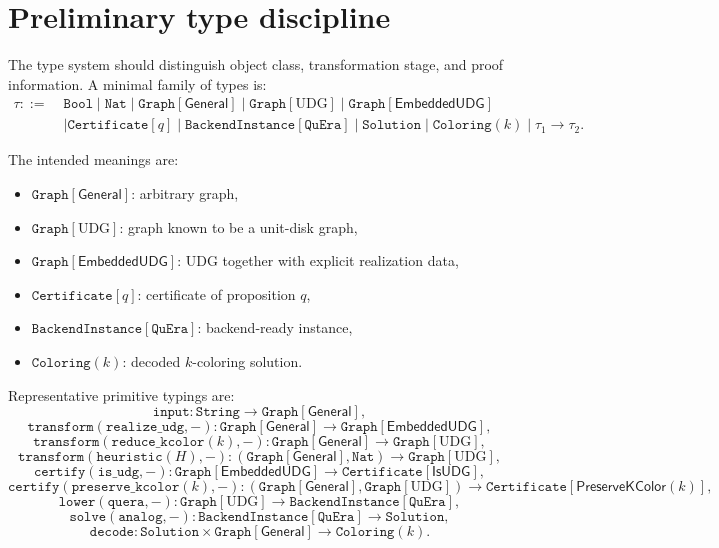 \documentclass[11pt]{article}
\newcommand{\UDG}{\mathrm{UDG}}
\newcommand{\Gen}{\mathsf{General}}
\newcommand{\Emb}{\mathsf{EmbeddedUDG}}
\begin{document}
\section{Preliminary type discipline}

The type system should distinguish object class, transformation stage, and proof information. A minimal family of types is:
\[
\begin{aligned}
\tau ::=\;& \texttt{Bool}
\mid \texttt{Nat}
\mid \texttt{Graph}[\Gen]
\mid \texttt{Graph}[\UDG]
\mid \texttt{Graph}[\Emb]\\
&\mid \texttt{Certificate}[q]
\mid \texttt{BackendInstance}[\texttt{QuEra}]
\mid \texttt{Solution}
\mid \texttt{Coloring}(k)
\mid \tau_1 \to \tau_2.
\end{aligned}
\]

The intended meanings are:
\begin{itemize}
    \item $\texttt{Graph}[\Gen]$: arbitrary graph,
    \item $\texttt{Graph}[\UDG]$: graph known to be a unit-disk graph,
    \item $\texttt{Graph}[\Emb]$: UDG together with explicit realization data,
    \item $\texttt{Certificate}[q]$: certificate of proposition $q$,
    \item $\texttt{BackendInstance}[\texttt{QuEra}]$: backend-ready instance,
    \item $\texttt{Coloring}(k)$: decoded $k$-coloring solution.
\end{itemize}

Representative primitive typings are:
\[
\texttt{input} : \texttt{String} \to \texttt{Graph}[\Gen],
\]
\[
\texttt{transform}(\texttt{realize\_udg},-) : \texttt{Graph}[\Gen] \to \texttt{Graph}[\Emb],
\]
\[
\texttt{transform}(\texttt{reduce\_kcolor}(k),-) : \texttt{Graph}[\Gen] \to \texttt{Graph}[\UDG],
\]
\[
\texttt{transform}(\texttt{heuristic}(H),-) : (\texttt{Graph}[\Gen], \texttt{Nat}) \to \texttt{Graph}[\UDG],
\]
\[
\texttt{certify}(\texttt{is\_udg},-) : \texttt{Graph}[\Emb] \to \texttt{Certificate}[\mathsf{IsUDG}],
\]
\[
\texttt{certify}(\texttt{preserve\_kcolor}(k),-) : (\texttt{Graph}[\Gen],\texttt{Graph}[\UDG]) \to \texttt{Certificate}[\mathsf{PreserveKColor}(k)],
\]
\[
\texttt{lower}(\texttt{quera},-) : \texttt{Graph}[\UDG] \to \texttt{BackendInstance}[\texttt{QuEra}],
\]
\[
\texttt{solve}(\texttt{analog},-) : \texttt{BackendInstance}[\texttt{QuEra}] \to \texttt{Solution},
\]
\[
\texttt{decode} : \texttt{Solution} \times \texttt{Graph}[\Gen] \to \texttt{Coloring}(k).
\]
\end{document}
